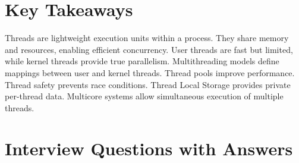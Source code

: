 \section{Key Takeaways}

\begin{keytakeaways}
Threads are lightweight execution units within a process. They share memory and resources, enabling efficient concurrency. User threads are fast but limited, while kernel threads provide true parallelism. Multithreading models define mappings between user and kernel threads. Thread pools improve performance. Thread safety prevents race conditions. Thread Local Storage provides private per-thread data. Multicore systems allow simultaneous execution of multiple threads.
\end{keytakeaways}

\section{Interview Questions with Answers}


